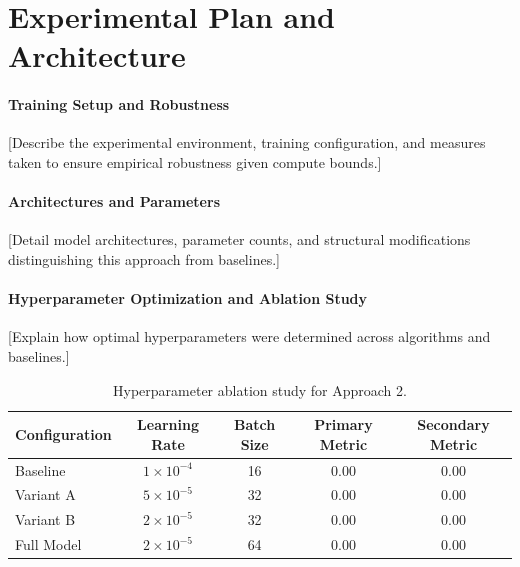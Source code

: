 \section{Experimental Plan and Architecture}
\label{sec:app2_experimental_plan}


\paragraph{Training Setup and Robustness}
[Describe the experimental environment, training configuration, and measures taken to ensure empirical robustness given compute bounds.]

\paragraph{Architectures and Parameters}
[Detail model architectures, parameter counts, and structural modifications distinguishing this approach from baselines.]

\paragraph{Hyperparameter Optimization and Ablation Study}
[Explain how optimal hyperparameters were determined across algorithms and baselines.]

\begin{table}[t]
\centering
\small
\begin{tabular}{lcccc}
\toprule
Configuration & Learning Rate & Batch Size & Primary Metric & Secondary Metric \\
\midrule
Baseline & $1 \times 10^{-4}$ & 16 & 0.00 & 0.00 \\
Variant A & $5 \times 10^{-5}$ & 32 & 0.00 & 0.00 \\
Variant B & $2 \times 10^{-5}$ & 32 & 0.00 & 0.00 \\
Full Model & $2 \times 10^{-5}$ & 64 & 0.00 & 0.00 \\
\bottomrule
\end{tabular}
\caption{Hyperparameter ablation study for Approach 2.}
\label{tab:app2_ablation}
\end{table}

